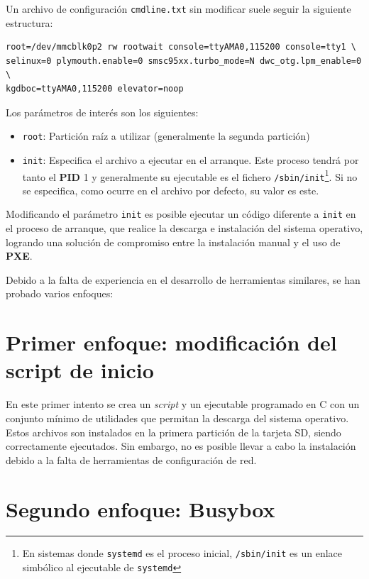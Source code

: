 \documentclass{article}
\begin{document}
Un archivo de configuración \texttt{cmdline.txt} sin modificar suele seguir la siguiente estructura:

\begin{lstlisting}[frame=single,basicstyle=\small\ttfamily]
root=/dev/mmcblk0p2 rw rootwait console=ttyAMA0,115200 console=tty1 \
selinux=0 plymouth.enable=0 smsc95xx.turbo_mode=N dwc_otg.lpm_enable=0 \
kgdboc=ttyAMA0,115200 elevator=noop
\end{lstlisting}

Los parámetros de interés son los siguientes:

\begin{itemize}
	\item \texttt{root}: Partición raíz a utilizar (generalmente la segunda partición)
	\item \texttt{init}: Especifica el archivo a ejecutar en el arranque. Este proceso tendrá por tanto el \textbf{PID} 1 y generalmente su ejecutable es el fichero \texttt{/sbin/init}\footnote{En sistemas donde \texttt{systemd} es el proceso inicial, \texttt{/sbin/init} es un enlace simbólico al ejecutable de \texttt{systemd}}. Si no se especifica, como ocurre en el archivo por defecto, su valor es este\cite{kernelparams:init}.
\end{itemize}

Modificando el parámetro \texttt{init} es posible ejecutar un código diferente a \texttt{init} en el proceso de arranque, que realice la descarga e instalación del sistema operativo, logrando una solución de compromiso entre la instalación manual y el uso de \textbf{PXE}.

Debido a la falta de experiencia en el desarrollo de herramientas similares, se han probado varios enfoques:

\section{Primer enfoque: modificación del script de inicio}

En este primer intento se crea un \textit{script} y un ejecutable programado en C con un conjunto mínimo de utilidades que permitan la descarga del sistema operativo. Estos archivos son instalados en la primera partición de la tarjeta SD, siendo correctamente ejecutados. Sin embargo, no es posible llevar a cabo la instalación debido a la falta de herramientas de configuración de red.

\section{Segundo enfoque: Busybox}
\end{document}
